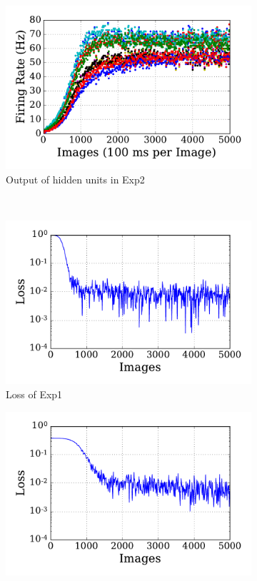 \begin{figure}
\begin{subfigure}[t]{0.45\textwidth}
		\includegraphics[width=\textwidth]{pics_sdlm/00_exp_SAE_Orig/exp2_hid_s.pdf}
		\caption{Output of hidden units in Exp2}
	\end{subfigure}\\
	\begin{subfigure}[t]{0.45\textwidth}
		\includegraphics[width=\textwidth]{pics_sdlm/00_exp_SAE_Orig/exp1_mse_nons.pdf}
		\caption{Loss of Exp1}
	\end{subfigure}
	\begin{subfigure}[t]{0.45\textwidth}
		\includegraphics[width=\textwidth]{pics_sdlm/00_exp_SAE_Orig/exp2_mse_nons.pdf}

\end{subfigure}
\end{figure}
